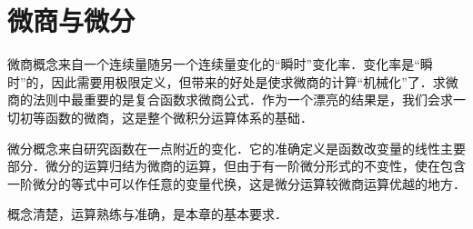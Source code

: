 \chapter{微商与微分}\label{chap:04}

微商概念来自一个连续量随另一个连续量变化的“瞬时”变化率．变化率是“瞬时”的，因此需要用极限定义，但带来的好处是使求微商的计算“机械化”了．求微商的法则中最重要的是复合函数求微商公式．作为一个漂亮的结果是，我们会求一切初等函数的微商，这是整个微积分运算体系的基础．

微分概念来自研究函数在一点附近的变化．它的准确定义是函数改变量的线性主要部分．微分的运算归结为微商的运算，但由于有一阶微分形式的不变性，使在包含一阶微分的等式中可以作任意的变量代换，这是微分运算较微商运算优越的地方．

概念清楚，运算熟练与准确，是本章的基本要求．





